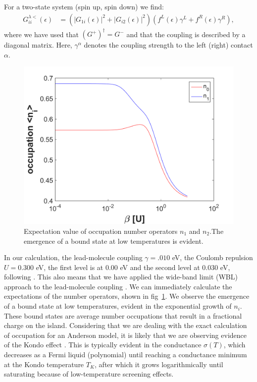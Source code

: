\documentclass{article}
\begin{document}
\begin{multicols}{2}
        For a two-state system (spin up, spin down) we find:
        \begin{align*}
            G^{\lambda<}_{ii}(\epsilon) &= \left(\left|G_{1i}(\epsilon)\right|^2 + \left|G_{i2}(\epsilon)\right|^2 \right)\left(f^L (\epsilon) \gamma^L+f^R (\epsilon) \gamma^R\right),
        \end{align*}
        where we have used that $(G^+)^\dagger=G^-$ and that the coupling is described by a diagonal matrix. Here, $\gamma^\alpha$ denotes the coupling strength to the left (right) contact $\alpha$.
        
        \begin{figure}[b]
            \centering
            \includegraphics[width=\textwidth]{figBigFont/occupation.png}
            \caption{\label{fig:numberoperators}Expectation value of occupation number operators $n_1$ and $n_2$.The emergence of a bound state at low temperatures is evident.}
        \end{figure}
          
        In our calculation, the lead-molecule coupling $\gamma=.010$ eV, the Coulomb repulsion $U=0.300$ eV, the first level is at $0.00$ eV and the second level at $0.030$ eV, following \citet{meir}. This also means that we have applied the wide-band limit (WBL) approach to the lead-molecule coupling \cite{diventra, Datta1997, haugjauho, Mattuck1976, perrinnano}. We can immediately calculate the expectations of the number operators, shown in fig~\ref{fig:numberoperators}. We observe the emergence of a bound state at low temperatures, evident in the exponential growth of $n_i$. These bound states are average number occupations that result in a fractional charge on the island. Considering that we are dealing with the exact calculation of occupation for an Anderson model, it is likely that we are observing evidence of the Kondo effect \cite{josherrereview}. This is typically evident in the conductance $\sigma(T)$, which decreases as a Fermi liquid (polynomial) until reaching a conductance minimum at the Kondo temperature $T_K$, after which it grows logarithmically until saturating because of low-temperature screening effects.
        

\end{multicols}
\end{document}
